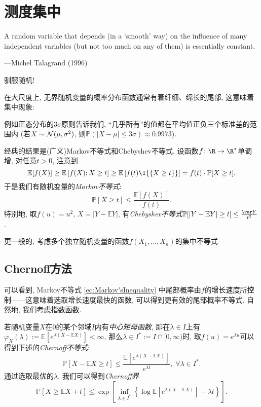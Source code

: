 \section{测度集中}

\epigraph{A random variable that depends (in a ‘smooth’ way) on the influence of many independent variables (but not too much on any of them) is essentially constant.}{---Michel Talagrand (1996)}

驯服随机! 

在大尺度上, 无界随机变量的概率分布函数通常有着纤细、绵长的尾部, 这意味着集中现象: 

例如正态分布的$3 \sigma$原则告诉我们, “几乎所有”的值都在平均值正负三个标准差的范围内 (若$X \sim \mathcal{N}(\mu, \sigma^2)$, 则$\mathbb{P}(|X - \mu| \leq 3 \sigma) \approx 0.9973$). 

经典的结果是(广义)Markov不等式和Chebyshev不等式.
设函数$f \colon \R \to \R^*$单调增, 对任意$t > 0$, 注意到
\begin{equation*}
	\mathbb{E}[f(X)] 
		\geq \mathbb{E}\left[f(X); X \geq t \right]
		\geq \mathbb{E}\left[f(t) \I{\{X \geq t\}} \right] 
		= f(t) \cdot \mathbb{P}[X \geq t].
\end{equation*}
于是我们有随机变量的\emph{Markov不等式}: 
\begin{equation}\label{eq:Markov'sInequality}
	\mathbb{P}[X \geq t] \leq \frac{\mathbb{E}[f(X)]}{f(t)}.
\end{equation}
特别地, 取$f(u) = u^2$, $X = |Y - \mathbb{E}Y|$, 有\emph{Chebyshev不等式}$\mathbb{P}[|Y - \mathbb{E}Y| \geq t] \leq \frac{\var Y}{t^2}$. 

更一般的, 考虑多个独立随机变量的函数$f(X_1, \dots, X_n)$的集中不等式


\subsection{Chernoff方法}

可以看到, Markov不等式 \eqref{eq:Markov'sInequality} 中尾部概率由$f$的增长速度所控制——这意味着选取增长速度最快的函数, 可以得到更有效的尾部概率不等式. 
自然地, 我们考虑指数函数. 

若随机变量$X$在$0$的某个邻域$I$内有\emph{中心矩母函数}, 即在$\lambda \in I$上有$\varphi_X(\lambda) := \mathbb{E}[e^{\lambda (X - \mathbb{E}X)}] < \infty$, 那么$\lambda \in I^* := I \cap [0, \infty)$时, 取$f(u) = e^{\lambda u}$可以得到下述的\emph{Chernoff不等式}: 
\begin{equation*}
	\mathbb{P}[X - \mathbb{E}X \geq t] 
	\leq \frac{\mathbb{E}[e^{\lambda(X - \mathbb{E}X)}]}{e^{\lambda t}},\;
	\forall \lambda \in I^*.
\end{equation*}
通过选取最优的$\lambda$, 我们可以得到\emph{Chernoff界}
\begin{equation*}
	\mathbb{P}[X \geq \mathbb{E}X + t]
	\leq \exp \left[ \inf_{\lambda \in I^*} \left\{ \log \mathbb{E}[e^{\lambda(X - \mathbb{E}X)}] - \lambda t \right\} \right]. 
\end{equation*}

